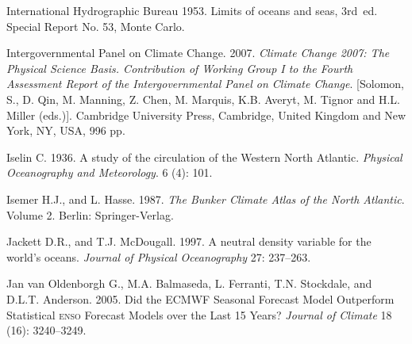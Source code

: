 \begin{thebibliography}{999}
International Hydrographic Bureau 1953. Limits of oceans and seas,
3rd~ed. Special Report No. 53, Monte Carlo.
%

Intergovernmental Panel on Climate Change. 2007. \textit{Climate
  Change 2007: The Physical Science Basis. Contribution of Working
  Group I to the Fourth Assessment Report of the Intergovernmental
  Panel on Climate Change}. [Solomon, S., D. Qin, M. Manning, Z. Chen,
  M. Marquis, K.B. Averyt, M. Tignor and H.L. Miller
  (eds.)]. Cambridge University Press, Cambridge, United Kingdom and
New York, NY, USA, 996 pp.
%

Iselin C.  1936. A study of the circulation of the Western North
Atlantic.  \textit{Physical Oceanography and Meteorology}. 6 (4): 101.
%

Isemer H.J., and L. Hasse.  1987. \textit{The Bunker Climate Atlas of
  the North Atlantic}. Volume 2.  Berlin: Springer-Verlag.
%

Jackett D.R., and T.J. McDougall.  1997. A neutral density variable
for the world's oceans. \textit{Journal of Physical Oceanography} 27:
237--263.
%

Jan van Oldenborgh G., M.A. Balmaseda, L. Ferranti, T.N. Stockdale,
and D.L.T. Anderson. 2005. Did the ECMWF Seasonal Forecast Model
Outperform Statistical \textsc{enso} Forecast Models over the Last 15
Years? \textit{Journal of Climate} 18 (16): 3240--3249.
%


\end{thebibliography}
